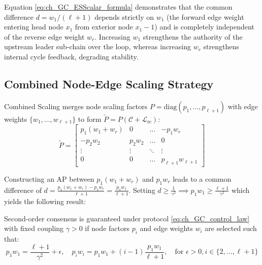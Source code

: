 \begin{remark}\label{rem:ch_GC_EdgeChoice}
Equation \eqref{eq:ch_GC_ESScalar_formula} demonstrates that the common difference $d = w_1 / (\ell+1)$ depends strictly on $w_1$ (the forward edge weight entering head node $x_1$ from exterior node $x_1 - 1$) and is completely independent of the reverse edge weight $w_r$. Increasing $w_1$ strengthens the authority of the upstream leader sub-chain over the loop, whereas increasing $w_r$ strengthens internal cycle feedback, degrading stability.
\end{remark}

\subsection{Combined Node-Edge Scaling Strategy}\label{sec:combo}

Combined Scaling merges node scaling factors $P = \text{diag}(p_1, \dots, p_{\ell+1})$ with edge weights $\{w_1, \dots, w_{\ell+1}\}$ to form $\tilde{P} = P(\mathcal{C} + \mathcal{L}_{\text{re}})$:
\begin{equation}\label{eq:ch_GC_eqcombined}
	\tilde{P} = \begin{bmatrix}
		p_1(w_1 + w_r)  & 0 & \dots & -p_1 w_r \\
		-p_2 w_2 & p_2 w_2 & \dots & 0 \\
		\vdots & \vdots & \ddots & \vdots \\
		0 & 0 & \dots & p_{\ell+1} w_{\ell+1}
	\end{bmatrix}
\end{equation}

Constructing an AP between $p_1(w_1 + w_r)$ and $p_1 w_r$ leads to a common difference of $d = \frac{p_1(w_1 + w_r) - p_1 w_r}{\ell + 1} = \frac{p_1 w_1}{\ell + 1}$. Setting $d \ge \frac{1}{\gamma^2} \implies p_1 w_1 \ge \frac{\ell+1}{\gamma^2}$ which yields the following result:

\begin{theo}\label{theo3}
\leavevmode\par\noindent
Second-order consensus is guaranteed under protocol \eqref{eq:ch_GC_control_law} with fixed coupling $\gamma > 0$ if node factors $p_i$ and edge weights $w_i$ are selected such that:
\begin{equation}
	p_1 w_1 = \frac{\ell+1}{\gamma^2} + \epsilon, \quad p_i w_i = p_1 w_1 + (i-1) \frac{p_1 w_1}{\ell+1}, \quad \text{for } \epsilon > 0, i \in \{2, \dots, \ell+1\}
\end{equation}
\end{theo}

